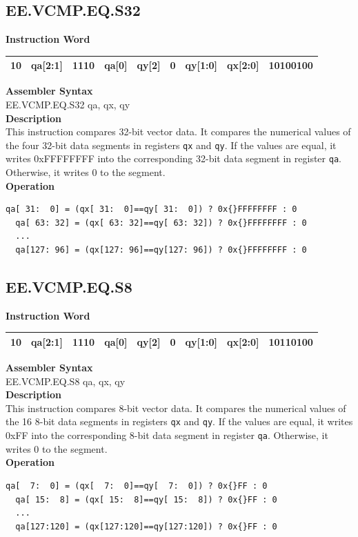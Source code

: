 \clearpage
\subsection{EE.VCMP.EQ.S32}\label{instruction:EEVCMPEQS32}
\setlength\tabcolsep{6pt}
\textbf{Instruction Word} \\
\begin{tabular}{|c|c|c|c|c|c|c|c|c|}
	\hline
	10 & qa[2:1] & 1110 & qa[0] & qy[2] & 0 & qy[1:0] & qx[2:0] & 10100100 \\
	\hline
\end{tabular}

\textbf{Assembler Syntax} \\
EE.VCMP.EQ.S32 qa, qx, qy \\
\textbf{Description} \\
This instruction compares 32-bit vector data. It compares the numerical values of the four 32-bit data segments in registers \lstinline{qx} and \lstinline{qy}. If the values are equal, it writes 0x{}FFFFFFFF into the corresponding 32-bit data segment in register \lstinline{qa}. Otherwise, it writes 0 to the segment.\\
\textbf{Operation}
\begin{lstlisting}[escapeinside=`?]
  qa[ 31:  0] = (qx[ 31:  0]==qy[ 31:  0]) ? 0x{}FFFFFFFF : 0
  qa[ 63: 32] = (qx[ 63: 32]==qy[ 63: 32]) ? 0x{}FFFFFFFF : 0
  ...
  qa[127: 96] = (qx[127: 96]==qy[127: 96]) ? 0x{}FFFFFFFF : 0
\end{lstlisting}

\clearpage
\subsection{EE.VCMP.EQ.S8}\label{instruction:EEVCMPEQS8}
\setlength\tabcolsep{6pt}
\textbf{Instruction Word} \\
\begin{tabular}{|c|c|c|c|c|c|c|c|c|}
	\hline
	10 & qa[2:1] & 1110 & qa[0] & qy[2] & 0 & qy[1:0] & qx[2:0] & 10110100 \\
	\hline
\end{tabular}

\textbf{Assembler Syntax} \\
EE.VCMP.EQ.S8 qa, qx, qy \\
\textbf{Description} \\
This instruction compares 8-bit vector data. It compares the numerical values of the 16 8-bit data segments in registers \lstinline{qx} and \lstinline{qy}. If the values are equal, it writes 0x{}FF into the corresponding 8-bit data segment in register \lstinline{qa}. Otherwise, it writes 0 to the segment.\\
\textbf{Operation}
\begin{lstlisting}[escapeinside=`?]
  qa[  7:  0] = (qx[  7:  0]==qy[  7:  0]) ? 0x{}FF : 0
  qa[ 15:  8] = (qx[ 15:  8]==qy[ 15:  8]) ? 0x{}FF : 0
  ...
  qa[127:120] = (qx[127:120]==qy[127:120]) ? 0x{}FF : 0
\end{lstlisting}

